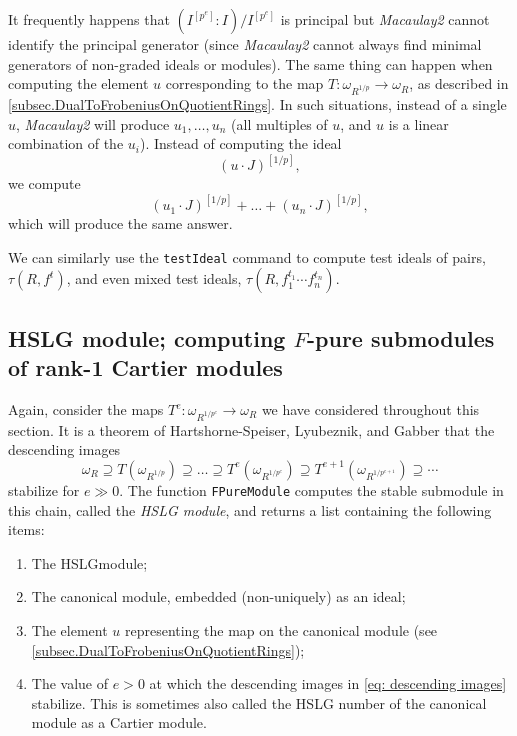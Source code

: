\documentclass{amsart}
\begin{document}
\begin{remark}
   It frequently happens that $(I^{[p^e]} : I)/I^{[p^e]}$ is principal but \emph{Macaulay2} cannot identify the principal generator (since \emph{Macaulay2} cannot always find minimal generators of non-graded ideals or modules).
   The same thing can happen when computing the element $u$ corresponding to the map $T : \omega_{R^{1/p}} \to \omega_R$, as described in \autoref{subsec.DualToFrobeniusOnQuotientRings}.
   In such situations, instead of a single $u$, \emph{Macaulay2} will produce $u_1, \dots, u_n$ (all multiples of $u$, and $u$ is a linear combination of the $u_i$).  Instead of computing the ideal
\[
(u \cdot J)^{[1/p]},
\]
we compute
\[
(u_1 \cdot J)^{[1/p]} + \dots + (u_n \cdot J)^{[1/p]},
\]
which will produce the same answer.
\end{remark}

We can similarly use the \texttt{testIdeal} command to compute test ideals of pairs, $\tau(R, f^t)$, and even mixed test ideals, $\tau(R, f_1^{t_1} \cdots f_n^{t_n})$.

\subsection{HSLG module; computing $F$-pure submodules of rank-1 Cartier modules}

Again, consider the maps $T^e : \omega_{R^{1/p^e}} \to \omega_R$ we have considered throughout this section.  It is a theorem of Hartshorne-Speiser, Lyubeznik, and Gabber \cite{HartshorneSpeiserLocalCohomologyInCharacteristicP,LyubeznikFModulesApplicationsToLocalCohomology,Gabber.tStruc} that the descending images
\begin{equation}\label{eq: descending images}
\omega_R \supseteq T(\omega_{R^{1/p}}) \supseteq \dots \supseteq T^e(\omega_{R^{1/p^e}}) \supseteq T^{e+1}(\omega_{R^{1/p^{e+1}}}) \supseteq \cdots
\end{equation}
stabilize for $e \gg 0$.
The function \texttt{FPureModule} computes the stable submodule in this chain, called the \emph{HSLG module}, and returns a list containing the following items:
\begin{enumerate}[(1)]
   \item The HSLGmodule;
   \item The canonical module, embedded (non-uniquely) as an ideal;
   \item The element $u$ representing the map on the canonical module (see
   \autoref{subsec.DualToFrobeniusOnQuotientRings});
   \item The value of $e > 0$ at which the descending images in \eqref{eq: descending images} stabilize.  This is sometimes also called the HSLG number of the canonical module as a Cartier module.
\end{enumerate}
\end{document}
